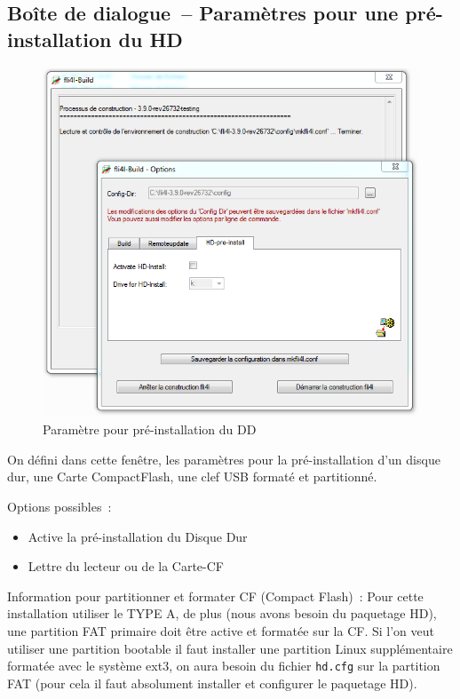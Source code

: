   \subsection{Boîte de dialogue~-- Paramètres pour une pré-installation du HD}
  \begin{figure}[h!]
  \centering
  \includegraphics[width=\columnwidth]{win_build_hd_install}
  \caption{Paramètre pour pré-installation du DD}
  \label{fig:win_build_hd_install}
  \end{figure}

   On défini dans cette fenêtre, les paramètres pour la pré-installation
   d'un disque dur, une Carte CompactFlash, une clef USB formaté et partitionné.

   Options possibles~:
  \begin{itemize}
     \item Active la pré-installation du Disque Dur
     \item Lettre du lecteur ou de la Carte-CF
  \end{itemize}

  Information pour partitionner et formater CF (Compact Flash)~: Pour
  cette installation utiliser le TYPE A, de plus (nous avons besoin
  du paquetage HD), une partition FAT primaire doit être active et
  formatée sur la CF. Si l'on veut utiliser une partition bootable
  il faut installer une partition Linux supplémentaire formatée avec
  le système ext3, on aura besoin du fichier \texttt{hd.cfg} sur la partition
  FAT (pour cela il faut absolument installer et configurer le paquetage HD).


